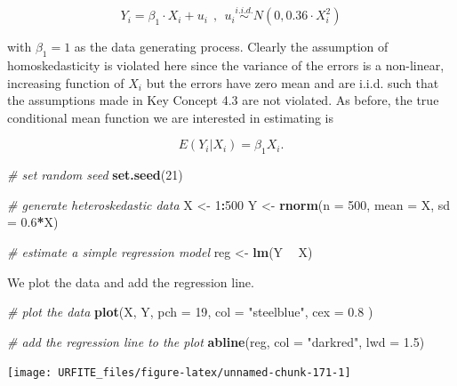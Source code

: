 \documentclass[]{book}
\newenvironment{Shaded}{\begin{snugshade}}{\end{snugshade}}
\newcommand{\KeywordTok}[1]{\textcolor[rgb]{0.13,0.29,0.53}{\textbf{#1}}}
\newcommand{\DataTypeTok}[1]{\textcolor[rgb]{0.13,0.29,0.53}{#1}}
\newcommand{\DecValTok}[1]{\textcolor[rgb]{0.00,0.00,0.81}{#1}}
\newcommand{\FloatTok}[1]{\textcolor[rgb]{0.00,0.00,0.81}{#1}}
\newcommand{\StringTok}[1]{\textcolor[rgb]{0.31,0.60,0.02}{#1}}
\newcommand{\CommentTok}[1]{\textcolor[rgb]{0.56,0.35,0.01}{\textit{#1}}}
\newcommand{\OperatorTok}[1]{\textcolor[rgb]{0.81,0.36,0.00}{\textbf{#1}}}
\newcommand{\NormalTok}[1]{#1}
\theoremstyle{definition}
\theoremstyle{definition}
\theoremstyle{definition}
\theoremstyle{remark}
\begin{document}
\[ Y_i = \beta_1 \cdot X_i + u_i \ \ , \ \ u_i \overset{i.i.d.}{\sim} N(0,0.36 \cdot X_i^2)  \]

with \(\beta_1=1\) as the data generating process. Clearly the
assumption of homoskedasticity is violated here since the variance of
the errors is a non-linear, increasing function of \(X_i\) but the
errors have zero mean and are i.i.d. such that the assumptions made in
Key Concept 4.3 are not violated. As before, the true conditional mean
function we are interested in estimating is

\[ E(Y_i\vert X_i) = \beta_1 X_i. \]

\begin{Shaded}
\begin{Highlighting}[]
\CommentTok{# set random seed}
\KeywordTok{set.seed}\NormalTok{(}\DecValTok{21}\NormalTok{)}

\CommentTok{# generate heteroskedastic data }
\NormalTok{X <-}\StringTok{ }\DecValTok{1}\OperatorTok{:}\DecValTok{500}
\NormalTok{Y <-}\StringTok{ }\KeywordTok{rnorm}\NormalTok{(}\DataTypeTok{n =} \DecValTok{500}\NormalTok{, }\DataTypeTok{mean =}\NormalTok{ X, }\DataTypeTok{sd =} \FloatTok{0.6}\OperatorTok{*}\NormalTok{X)}

\CommentTok{# estimate a simple regression model}
\NormalTok{reg <-}\StringTok{ }\KeywordTok{lm}\NormalTok{(Y }\OperatorTok{~}\StringTok{ }\NormalTok{X)}
\end{Highlighting}
\end{Shaded}

We plot the data and add the regression line.

\begin{Shaded}
\begin{Highlighting}[]
\CommentTok{# plot the data}
\KeywordTok{plot}\NormalTok{(X, Y, }
     \DataTypeTok{pch =} \DecValTok{19}\NormalTok{, }
     \DataTypeTok{col =} \StringTok{"steelblue"}\NormalTok{, }
     \DataTypeTok{cex =} \FloatTok{0.8}
\NormalTok{     )}

\CommentTok{# add the regression line to the plot}
\KeywordTok{abline}\NormalTok{(reg, }
       \DataTypeTok{col =} \StringTok{"darkred"}\NormalTok{, }
       \DataTypeTok{lwd =} \FloatTok{1.5}\NormalTok{)}
\end{Highlighting}
\end{Shaded}

\begin{center}\texttt{[image: URFITE\_files/figure-latex/unnamed-chunk-171-1]} \end{center}
\end{document}
